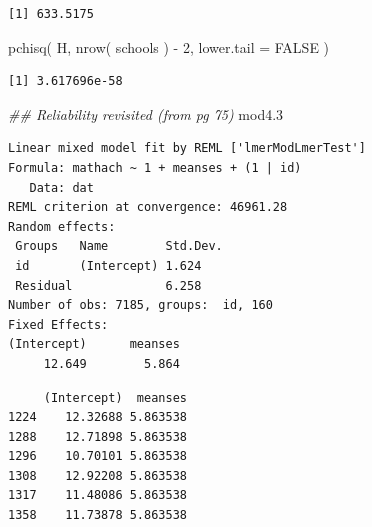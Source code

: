 \documentclass[
  letterpaper,
  DIV=11,
  numbers=noendperiod]{scrreprt}
\newenvironment{Shaded}{}{}
\newcommand{\AttributeTok}[1]{\textcolor[rgb]{0.49,0.56,0.16}{#1}}
\newcommand{\ConstantTok}[1]{\textcolor[rgb]{0.53,0.00,0.00}{#1}}
\newcommand{\DecValTok}[1]{\textcolor[rgb]{0.25,0.63,0.44}{#1}}
\newcommand{\DocumentationTok}[1]{\textcolor[rgb]{0.73,0.13,0.13}{\textit{#1}}}
\newcommand{\FloatTok}[1]{\textcolor[rgb]{0.25,0.63,0.44}{#1}}
\newcommand{\FunctionTok}[1]{\textcolor[rgb]{0.02,0.16,0.49}{#1}}
\newcommand{\NormalTok}[1]{#1}
\newcommand{\OtherTok}[1]{\textcolor[rgb]{0.00,0.44,0.13}{#1}}
\newcommand{\SpecialCharTok}[1]{\textcolor[rgb]{0.25,0.44,0.63}{#1}}
\begin{document}
\begin{verbatim}
[1] 633.5175
\end{verbatim}

\begin{Shaded}
\begin{Highlighting}[]
\FunctionTok{pchisq}\NormalTok{( H, }\FunctionTok{nrow}\NormalTok{( schools ) }\SpecialCharTok{{-}} \DecValTok{2}\NormalTok{, }\AttributeTok{lower.tail =} \ConstantTok{FALSE}\NormalTok{ )}
\end{Highlighting}
\end{Shaded}

\begin{verbatim}
[1] 3.617696e-58
\end{verbatim}

\begin{Shaded}
\begin{Highlighting}[]
\DocumentationTok{\#\# Reliability revisited (from pg 75)}
\NormalTok{mod4}\FloatTok{.3}
\end{Highlighting}
\end{Shaded}

\begin{verbatim}
Linear mixed model fit by REML ['lmerModLmerTest']
Formula: mathach ~ 1 + meanses + (1 | id)
   Data: dat
REML criterion at convergence: 46961.28
Random effects:
 Groups   Name        Std.Dev.
 id       (Intercept) 1.624   
 Residual             6.258   
Number of obs: 7185, groups:  id, 160
Fixed Effects:
(Intercept)      meanses  
     12.649        5.864  
\end{verbatim}

\begin{Shaded}
\end{Shaded}

\begin{verbatim}
     (Intercept)  meanses
1224    12.32688 5.863538
1288    12.71898 5.863538
1296    10.70101 5.863538
1308    12.92208 5.863538
1317    11.48086 5.863538
1358    11.73878 5.863538
\end{verbatim}

\begin{Shaded}
\end{Shaded}
\end{document}
